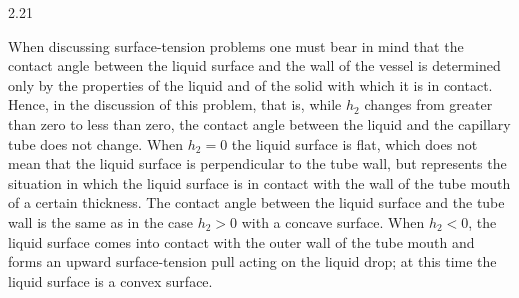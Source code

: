 \begin{solution}{2.21}
\begin{commentary}
When discussing surface-tension problems one must bear in mind that the contact angle between
the liquid surface and the wall of the vessel is determined only by the properties of the liquid
and of the solid with which it is in contact. Hence, in the discussion of this problem, that is,
while $h_2$ changes from greater than zero to less than zero, the contact angle between the
liquid and the capillary tube does not change. When $h_2=0$ the liquid surface is flat, which
does not mean that the liquid surface is perpendicular to the tube wall, but represents the
situation in which the liquid surface is in contact with the wall of the tube mouth of a certain
thickness. The contact angle between the liquid surface and the tube wall is the same as in the
case $h_2>0$ with a concave surface. When $h_2<0$, the liquid surface comes into contact with the
outer wall of the tube mouth and forms an upward surface-tension pull acting on the liquid drop;
at this time the liquid surface is a convex surface.
\end{commentary}
\end{solution}

